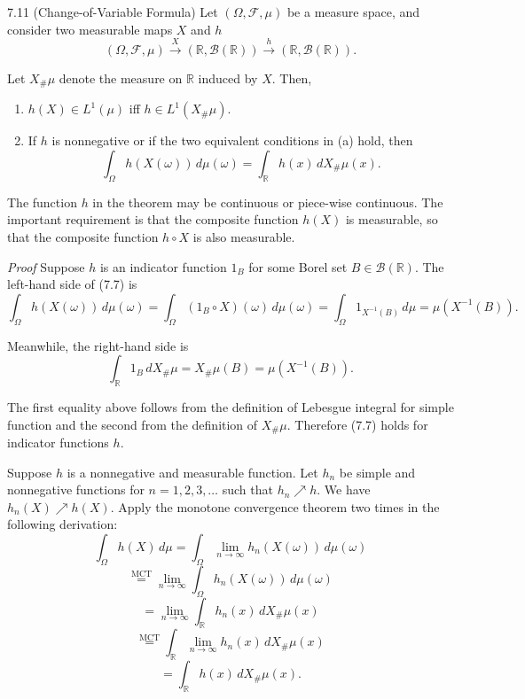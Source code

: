\begin{thmbox}{7.11 (Change-of-Variable Formula)}
Let $(\Omega,\mathcal{F},\mu)$ be a measure space, and consider two measurable maps $X$ and $h$
\[
(\Omega,\mathcal{F},\mu)\xrightarrow{X} (\mathbb{R},\mathcal{B}(\mathbb{R})) \xrightarrow{h} (\mathbb{R},\mathcal{B}(\mathbb{R})).
\]

Let $X_{\#}\mu$ denote the measure on $\mathbb{R}$ induced by $X$. Then,
\begin{enumerate}[label=(\alph*)]
    \item $h(X)\in L^1(\mu)$ iff $h\in L^1(X_{\#}\mu)$.
    \item If $h$ is nonnegative or if the two equivalent conditions in (a) hold, then
    \begin{equation}
    \int_{\Omega} h(X(\omega))\, d\mu(\omega)
    =
    \int_{\mathbb{R}} h(x)\, dX_{\#}\mu(x).
    \tag{7.7}
    \end{equation}
\end{enumerate}
\end{thmbox}

The function $h$ in the theorem may be continuous or piece-wise continuous. The important requirement is that the composite function $h(X)$ is measurable, so that the composite function $h\circ X$ is also measurable.

\textit{Proof} Suppose $h$ is an indicator function $1_B$ for some Borel set $B\in \mathcal{B}(\mathbb{R})$. The left-hand side of (7.7) is
\[
\int_{\Omega} h(X(\omega))\, d\mu(\omega)
=
\int_{\Omega} (1_B\circ X)(\omega)\, d\mu(\omega)
=
\int_{\Omega} 1_{X^{-1}(B)}\, d\mu
=
\mu(X^{-1}(B)).
\]

Meanwhile, the right-hand side is
\[
\int_{\mathbb{R}} 1_B\, dX_{\#}\mu = X_{\#}\mu(B)=\mu(X^{-1}(B)).
\]

The first equality above follows from the definition of Lebesgue integral for simple function and the second from the definition of $X_{\#}\mu$. Therefore (7.7) holds for indicator functions $h$.

Suppose $h$ is a nonnegative and measurable function. Let $h_n$ be simple and nonnegative functions for $n=1,2,3,\dots$ such that $h_n \nearrow h$. We have $h_n(X)\nearrow h(X)$. Apply the monotone convergence theorem two times in the following derivation:
\[
\int_{\Omega} h(X)\, d\mu
=
\int_{\Omega} \lim_{n\to\infty} h_n(X(\omega))\, d\mu(\omega)
\]
\[
\stackrel{\text{MCT}}{=}
\lim_{n\to\infty} \int_{\Omega} h_n(X(\omega))\, d\mu(\omega)
\]
\[
=
\lim_{n\to\infty} \int_{\mathbb{R}} h_n(x)\, dX_{\#}\mu(x)
\]
\[
\stackrel{\text{MCT}}{=}
\int_{\mathbb{R}} \lim_{n\to\infty} h_n(x)\, dX_{\#}\mu(x)
\]
\[
=
\int_{\mathbb{R}} h(x)\, dX_{\#}\mu(x).
\]


